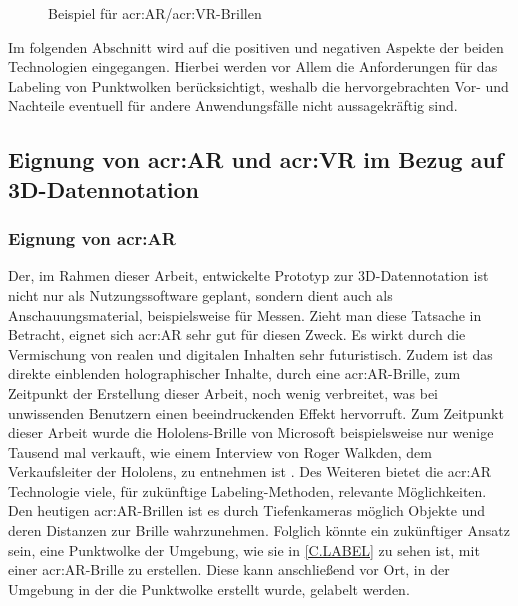 \begin{figure}%
    \centering
    \qquad
    \caption{Beispiel für \acrshort{acr:AR}/\acrshort{acr:VR}-Brillen}%
\end{figure}

Im folgenden Abschnitt wird auf die positiven und negativen Aspekte der beiden Technologien eingegangen. Hierbei werden vor Allem die Anforderungen für das Labeling von Punktwolken berücksichtigt, weshalb die hervorgebrachten Vor- und Nachteile eventuell für andere Anwendungsfälle nicht aussagekräftig sind.

\subsection{Eignung von \acrlong{acr:AR} und \acrlong{acr:VR} im Bezug auf 3D-Datennotation}
\subsubsection{Eignung von \acrlong{acr:AR}}
Der, im Rahmen dieser Arbeit, entwickelte Prototyp zur 3D-Datennotation ist nicht nur als Nutzungssoftware geplant, sondern dient auch als Anschauungsmaterial, beispielsweise für Messen. Zieht man diese Tatsache in Betracht, eignet sich \acrlong{acr:AR} sehr gut für diesen Zweck. Es wirkt durch die Vermischung von realen und digitalen Inhalten sehr futuristisch. Zudem ist das direkte einblenden holographischer Inhalte, durch eine \acrshort{acr:AR}-Brille, zum Zeitpunkt der Erstellung dieser Arbeit, noch wenig verbreitet, was bei unwissenden Benutzern einen beeindruckenden Effekt hervorruft. Zum Zeitpunkt dieser Arbeit wurde die Hololens-Brille von Microsoft beispielsweise nur wenige Tausend mal verkauft, wie einem Interview von Roger Walkden, dem Verkaufsleiter der Hololens, zu entnehmen ist \cite{HololensVerkaufszahlen}. Des Weiteren bietet die \acrlong{acr:AR} Technologie viele, für zukünftige Labeling-Methoden, relevante Möglichkeiten. Den heutigen \acrshort{acr:AR}-Brillen ist es durch Tiefenkameras möglich Objekte und deren Distanzen zur Brille wahrzunehmen. Folglich könnte ein zukünftiger Ansatz sein, eine Punktwolke der Umgebung, wie sie in \ref{C.LABEL} zu sehen ist, mit einer \acrshort{acr:AR}-Brille zu erstellen. Diese kann anschließend vor Ort, in der Umgebung in der die Punktwolke erstellt wurde, gelabelt werden.\\ %

